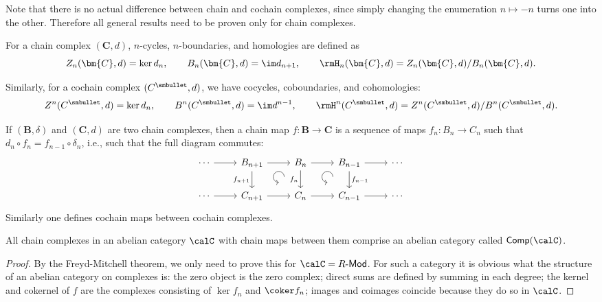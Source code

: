 Note that there is no actual difference between chain and cochain complexes, since simply changing the enumeration $n\mapsto -n$ turns one into the other. Therefore all general results need to be proven only for chain complexes.

\begin{defn}
    For a chain complex $(\bm{C},d)$, $n$-cycles, $n$-boundaries, and homologies are defined as 
    \[Z_n(\bm{C},d)=\ker d_n,\quad\quad B_n(\bm{C},d)=\im d_{n+1},\quad\quad \rmH_n(\bm{C},d)=Z_n(\bm{C},d)/B_n(\bm{C},d).\]
    
    Similarly, for a cochain complex $(C^{\smbullet },d)$, we have cocycles, coboundaries, and cohomologies:
    \[Z^n(C^{\smbullet },d)=\ker d_n,\quad\quad B^n(C^{\smbullet },d)=\im d^{n-1},\quad\quad \rmH^n(C^{\smbullet },d)=Z^n(C^{\smbullet },d)/B^n(C^{\smbullet },d).\]
\end{defn}

\begin{defn}
    If $(\bm{B},\delta )$ and $(\bm{C},d)$ are two chain complexes, then a chain map $f:\bm{B}\to \bm{C}$ is a sequence of maps $f_n:B_n\to C_n$ such that $d_n\circ f_n=f_{n-1}\circ \delta_n$, i.e., such that the full diagram commutes:
    \[\begin{tikzcd}[every matrix/.append style={name=m},
        execute at end picture={\draw [<-] ([xshift=-8mm,yshift=-10mm]m-1-3.north) arc[start angle=-90,delta angle=-270,radius=0.2cm];
        \draw [<-] ([xshift=-8mm,yshift=-10mm]m-1-4.north) arc[start angle=-90,delta angle=-270,radius=0.2cm];}]
        \cdots\arrow[r] & B_{n+1}\arrow[r]\arrow[d,swap,"f_{n+1}"] & B_{n} \arrow[r]\arrow[d,swap,"f_n"] & B_{n-1}\arrow[d,"f_{n-1}"]\arrow[r] & \cdots \\
       \cdots\arrow[r] & C_{n+1}\arrow[r] & C_n\arrow[r] &C_{n-1} \arrow[r] &\cdots
    \end{tikzcd}\]
    Similarly one defines cochain maps between cochain complexes.
\end{defn}

\begin{prop}
    All chain complexes in an abelian category $\calC$ with chain maps between them comprise an abelian category called $\mathsf{Comp}(\calC)$.
\end{prop}
\begin{proof}
    By the Freyd-Mitchell theorem, we only need to prove this for $\calC=R\text{-}\mathsf{Mod}$. For such a category it is obvious what the structure of an abelian category on complexes is: the zero object is the zero complex; direct sums are defined by summing in each degree; the kernel and cokernel of $f$ are the complexes consisting of $\ker f_n$ and $\coker f_n$; images and coimages coincide because they do so in $\calC$.
\end{proof}

